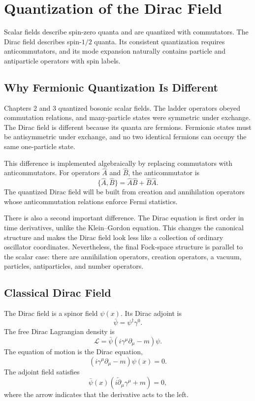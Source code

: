 \chapter{Quantization of the Dirac Field}

\begin{remarkbox}
Scalar fields describe spin-zero quanta and are quantized with commutators. The
Dirac field describes spin-\(1/2\) quanta. Its consistent quantization requires
anticommutators, and its mode expansion naturally contains particle and
antiparticle operators with spin labels.
\end{remarkbox}

\section{Why Fermionic Quantization Is Different}

Chapters 2 and 3 quantized bosonic scalar fields. The ladder operators obeyed
commutation relations, and many-particle states were symmetric under exchange.
The Dirac field is different because its quanta are fermions. Fermionic states
must be antisymmetric under exchange, and no two identical fermions can occupy
the same one-particle state.

This difference is implemented algebraically by replacing commutators with
anticommutators. For operators \(\hat A\) and \(\hat B\), the anticommutator is
\[
    \{\hat A,\hat B\}
    = \hat A\hat B+\hat B\hat A.
\]
The quantized Dirac field will be built from creation and annihilation operators
whose anticommutation relations enforce Fermi statistics.

There is also a second important difference. The Dirac equation is first order
in time derivatives, unlike the Klein--Gordon equation. This changes the
canonical structure and makes the Dirac field look less like a collection of
ordinary oscillator coordinates. Nevertheless, the final Fock-space structure is
parallel to the scalar case: there are annihilation operators, creation
operators, a vacuum, particles, antiparticles, and number operators.

\section{Classical Dirac Field}

The Dirac field is a spinor field \(\psi(x)\). Its Dirac adjoint is
\[
    \bar\psi = \psi^\dagger\gamma^0.
\]
The free Dirac Lagrangian density is
\[
    \mathcal{L}
    = \bar\psi(i\gamma^\mu\partial_\mu-m)\psi.
\]
The equation of motion is the Dirac equation,
\[
    (i\gamma^\mu\partial_\mu-m)\psi(x)=0.
\]
The adjoint field satisfies
\[
    \bar\psi(x)(i\overleftarrow{\partial}_\mu\gamma^\mu+m)=0,
\]
where the arrow indicates that the derivative acts to the left.

